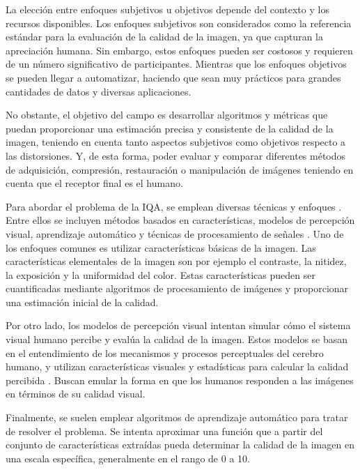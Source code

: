 La elección entre enfoques subjetivos u objetivos depende del contexto y los 
recursos disponibles. Los enfoques subjetivos son considerados como la referencia estándar 
para la evaluación de la calidad de la imagen, ya que capturan la apreciación 
humana. Sin embargo, estos enfoques pueden ser costosos y requieren de un número 
significativo de participantes. 
Mientras que los enfoques objetivos se pueden llegar a automatizar, haciendo que 
sean muy prácticos para grandes cantidades de datos y diversas aplicaciones.
 
No obstante, el objetivo del campo es desarrollar algoritmos y métricas que puedan proporcionar una 
estimación precisa y consistente de la calidad de la imagen, teniendo en cuenta
tanto aspectos subjetivos como objetivos respecto a las distorsiones.
Y, de esta forma, poder evaluar y comparar diferentes métodos de adquisición, compresión, 
restauración o manipulación de imágenes teniendo en cuenta que el receptor 
final es el humano.
 
Para abordar el problema de la IQA, se emplean diversas técnicas y enfoques
\cite{MinkowskiFailure, Wang2006ModernIQ, VisualMedicalQualityBook}.
Entre ellos se incluyen métodos basados en características,
modelos de percepción visual, aprendizaje automático y técnicas de procesamiento de señales
\cite{SSIM, MMF, DSS}.
Uno de los enfoques comunes es utilizar características básicas de la imagen. 
Las características elementales de la imagen son por ejemplo el contraste, 
la nitidez, la exposición y la uniformidad del color\cite{MinkowskiFailure,Wang2006ModernIQ}. 
Estas características pueden ser cuantificadas mediante algoritmos de procesamiento de 
imágenes y proporcionar una estimación inicial de la calidad. 
 
Por otro lado, los modelos de percepción visual intentan simular cómo el sistema 
visual humano percibe y evalúa la calidad de la imagen. Estos modelos se basan 
en el entendimiento de los mecanismos y procesos perceptuales del cerebro humano, 
y utilizan características visuales y estadísticas para calcular la calidad percibida
\cite{MinkowskiFailure, SSIM}.
Buscan emular la forma en que los humanos responden 
a las imágenes en términos de su calidad visual\cite{VSI, CascadedIQA}.
 
Finalmente, se suelen emplear algoritmos de aprendizaje automático para tratar
de resolver el problema. Se intenta aproximar una función que a partir del conjunto 
de características extraídas pueda determinar la calidad de la imagen en una escala 
específica, generalmente en el rango de 0 a 10.

